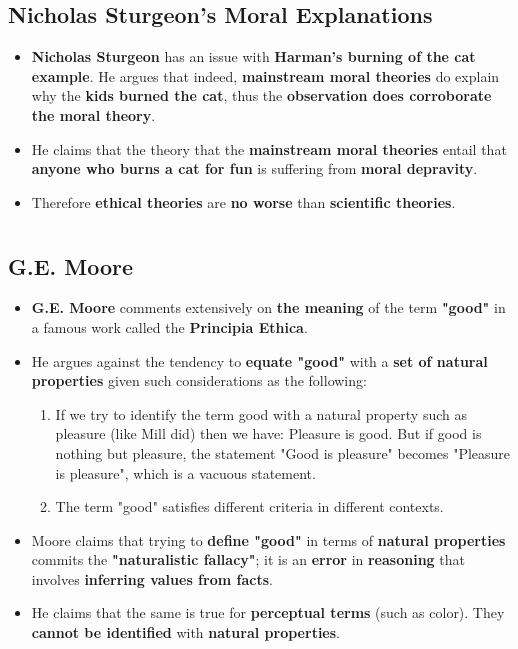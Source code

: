 \documentclass{article}
\begin{document}
    \subsection*{Nicholas Sturgeon's Moral Explanations}
    \begin{itemize}
        \item \textbf{Nicholas Sturgeon} has an issue with \textbf{Harman's burning of the cat example}. He argues that indeed, \textbf{mainstream moral theories} do explain why the \textbf{kids burned the cat}, thus the \textbf{observation does corroborate the moral theory}.
        \item He claims that the theory that the \textbf{mainstream moral theories} entail that \textbf{anyone who burns a cat for fun} is suffering from \textbf{moral depravity}.
        \item Therefore \textbf{ethical theories} are \textbf{no worse} than \textbf{scientific theories}.
    \end{itemize}

    \section*{}
    
    \subsection*{G.E. Moore}
    \begin{itemize}
        \item \textbf{G.E. Moore} comments extensively on \textbf{the meaning} of the term \textbf{"good"} in a famous work called the \textbf{Principia Ethica}.
        \item He argues against the tendency to \textbf{equate "good"} with a \textbf{set of natural properties} given such considerations as the following:
        \begin{enumerate}
            \item If we try to identify the term good with a natural property such as pleasure (like Mill did) then we have: Pleasure is good. But if good is nothing but pleasure, the statement "Good is pleasure" becomes "Pleasure is pleasure", which is a vacuous statement.
            \item The term "good" satisfies different criteria in different contexts.
        \end{enumerate}
        \item Moore claims that trying to \textbf{define "good"} in terms of \textbf{natural properties} commits the \textbf{"naturalistic fallacy"}; it is an \textbf{error} in \textbf{reasoning} that involves \textbf{inferring values from facts}.
        \item He claims that the same is true for \textbf{perceptual terms} (such as color). They \textbf{cannot be identified} with \textbf{natural properties}.
    \end{itemize}
\end{document}
